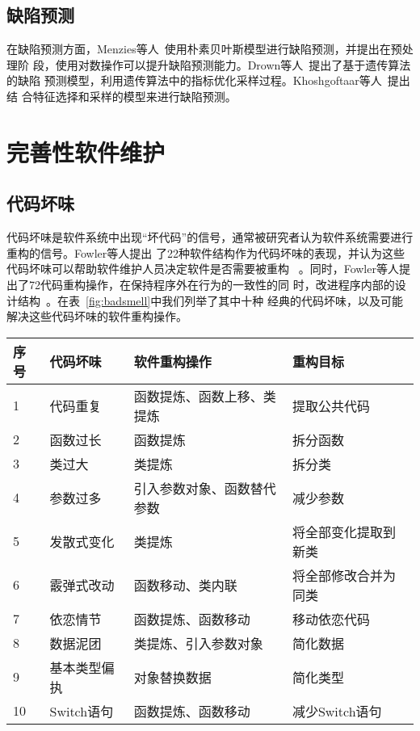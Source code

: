 \subsection{缺陷预测}

在缺陷预测方面，Menzies等人~\cite{menzies2007data}使用朴素贝叶斯模型进行缺陷预测，并提出在预处理阶
段，使用对数操作可以提升缺陷预测能力。Drown等人~\cite{drown2009evolutionary}提出了基于遗传算法的缺陷
预测模型，利用遗传算法中的指标优化采样过程。Khoshgoftaar等人~\cite{khoshgoftaar2010attribute}提出结
合特征选择和采样的模型来进行缺陷预测。
\section{完善性软件维护}

\subsection{代码坏味}
代码坏味是软件系统中出现``坏代码''的信号，通常被研究者认为软件系统需要进行重构的信号。Fowler等人提出
了22种软件结构作为代码坏味的表现，并认为这些代码坏味可以帮助软件维护人员决定软件是否需要被重构
~\cite{fowler1999refactoring}。同时，Fowler等人提出了72代码重构操作，在保持程序外在行为的一致性的同
时，改进程序内部的设计结构~\cite{fowler1999refactoring}。在表~\ref{fig:badsmell}中我们列举了其中十种
经典的代码坏味，以及可能解决这些代码坏味的软件重构操作。

\begin{center}
\label{fig:badsmell}
\begin{tabular}{|l|l|l|l|}
\hline
序号 & 代码坏味 & 软件重构操作 & 重构目标\\ \hline
1 & 代码重复 & 函数提炼、函数上移、类提炼 & 提取公共代码\\ \hline
2 & 函数过长 & 函数提炼 & 拆分函数\\ \hline
3 & 类过大 & 类提炼 & 拆分类\\ \hline
4 & 参数过多 & 引入参数对象、函数替代参数 & 减少参数\\ \hline
5 & 发散式变化& 类提炼 & 将全部变化提取到新类\\ \hline
6 & 霰弹式改动& 函数移动、类内联 & 将全部修改合并为同类\\ \hline
7 & 依恋情节& 函数提炼、函数移动 & 移动依恋代码\\ \hline
8 & 数据泥团& 类提炼、引入参数对象 & 简化数据\\ \hline
9 & 基本类型偏执& 对象替换数据 & 简化类型 \\ \hline
10 & Switch语句 & 函数提炼、函数移动 & 减少Switch语句\\ \hline
\end{tabular}
\end{center}

